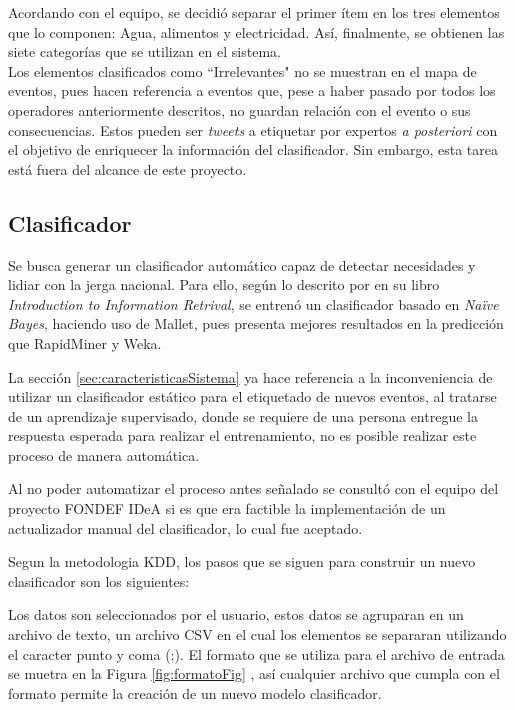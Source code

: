 Acordando con el equipo, se decidió separar el primer ítem en los tres elementos que lo componen: Agua, alimentos y electricidad. Así, finalmente, se obtienen las siete categorías que se utilizan en el sistema.\\

Los elementos clasificados como ``Irrelevantes" no se muestran en el mapa de eventos, pues hacen referencia a eventos que, pese a haber pasado por todos los operadores anteriormente descritos, no guardan relación con el evento o sus consecuencias. Estos pueden ser \textit{tweets} a etiquetar por expertos \textit{a posteriori} con el objetivo de enriquecer la información del clasificador. Sin embargo, esta tarea está fuera del alcance de este proyecto.

\subsection{Clasificador}
\label{sec:diseno:clasificador}

Se busca generar un clasificador automático capaz de detectar necesidades y lidiar con la jerga nacional. Para ello, según lo descrito por \citep{IRQE} en su libro \textit{Introduction to Information Retrival}, se entrenó un clasificador basado en \textit{Naïve Bayes}, haciendo uso de Mallet, pues presenta mejores resultados en la predicción que RapidMiner y Weka.

La sección \ref{sec:caracteristicasSistema} ya hace referencia a la inconveniencia de utilizar un clasificador estático para el etiquetado de nuevos eventos, al tratarse de un aprendizaje supervisado, donde se requiere de una persona entregue la respuesta esperada para realizar el entrenamiento, no es posible realizar este proceso de manera automática.

Al no poder automatizar el proceso antes señalado se consultó con el equipo del proyecto FONDEF IDeA si es que era factible la implementación de un actualizador manual del clasificador, lo cual fue aceptado.

Segun la metodologia KDD, los pasos que se siguen para construir un nuevo clasificador son los siguientes:

Los datos son seleccionados por el usuario, estos datos se agruparan en un archivo de texto, un archivo CSV en el cual los elementos se separaran utilizando el caracter punto y coma (;). El formato que se utiliza para el archivo de entrada se muetra en la Figura \ref{fig:formatoFig} , así cualquier archivo que cumpla con el formato permite la creación de un nuevo modelo clasificador.

